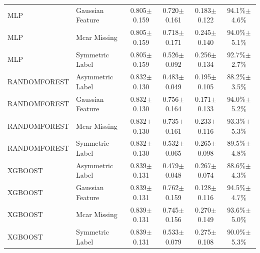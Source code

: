 \begin{table}[t]
\begin{tabular*}{\textwidth}{@{\extracolsep{\fill}}llcccc@{}}
MLP & Gaussian Feature & 0.805$\pm$0.159 & 0.720$\pm$0.161 & 0.183$\pm$0.122 & 94.1\%$\pm$4.6\% \\
MLP & Mcar Missing & 0.805$\pm$0.159 & 0.718$\pm$0.171 & 0.245$\pm$0.140 & 94.0\%$\pm$5.1\% \\
MLP & Symmetric Label & 0.805$\pm$0.159 & 0.526$\pm$0.092 & 0.256$\pm$0.134 & 92.7\%$\pm$2.7\% \\
\midrule
RANDOMFOREST & Asymmetric Label & 0.832$\pm$0.130 & 0.483$\pm$0.049 & 0.195$\pm$0.105 & 88.2\%$\pm$3.5\% \\
RANDOMFOREST & Gaussian Feature & 0.832$\pm$0.130 & 0.756$\pm$0.164 & 0.171$\pm$0.133 & 94.0\%$\pm$5.2\% \\
RANDOMFOREST & Mcar Missing & 0.832$\pm$0.130 & 0.735$\pm$0.161 & 0.233$\pm$0.116 & 93.3\%$\pm$5.3\% \\
RANDOMFOREST & Symmetric Label & 0.832$\pm$0.130 & 0.532$\pm$0.065 & 0.265$\pm$0.098 & 89.5\%$\pm$4.8\% \\
\midrule
XGBOOST & Asymmetric Label & 0.839$\pm$0.131 & 0.479$\pm$0.048 & 0.267$\pm$0.074 & 88.6\%$\pm$4.3\% \\
XGBOOST & Gaussian Feature & 0.839$\pm$0.131 & 0.762$\pm$0.159 & 0.128$\pm$0.116 & 94.5\%$\pm$4.7\% \\
XGBOOST & Mcar Missing & 0.839$\pm$0.131 & 0.745$\pm$0.156 & 0.270$\pm$0.149 & 93.6\%$\pm$5.0\% \\
XGBOOST & Symmetric Label & 0.839$\pm$0.131 & 0.533$\pm$0.079 & 0.275$\pm$0.108 & 90.0\%$\pm$5.3\% \\
\midrule
\bottomrule
\end{tabular*}
\end{table}
